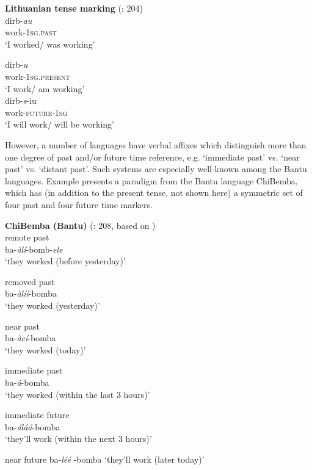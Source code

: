 \ea \label{ex:21.36}
\textbf{Lithuanian tense marking} (\citealt{ChungTimberlake1985}: 204)\\
\ea  
\gll dirb-\textit{au}\\
work-\textsc{1sg}\textsc{.past} \\
\glt ‘I worked/ was working’

\ex
\gll dirb-\textit{u}\\
work-\textsc{1sg}\textsc{.present} \\
\glt ‘I work/ am working’\\

\ex
\gll dirb-\textit{s}-iu\\
work-\textsc{future}-\textsc{1sg} \\
\glt ‘I will work/ will be working’
\z
\z

However, a number of languages have verbal affixes which distinguish more than one degree of past and/or future time reference, e.g. ‘immediate past’ vs. ‘near past’ vs. ‘distant past’. Such systems are especially well-known among the Bantu languages. Example  presents a paradigm from the Bantu language ChiBemba, which has (in addition to the present tense, not shown here) a symmetric set of four past and four future time markers.

\ea \label{ex:21.37}
\textbf{ChiBemba (Bantu)} (\citealt{ChungTimberlake1985}: 208, based on \citealt{Givón1972})\\
\ea  remote past\\
    ba-\textit{àlí}-bomb-\textit{ele}   \\
\glt‘they worked (before yesterday)’

\ex removed past\\
     ba-\textit{àlíí}-bomba   \\
\glt‘they worked (yesterday)’

\ex near past \\
    ba-\textit{àcí}-bomba   \\
\glt‘they worked (today)’

\ex immediate past \\
   ba-\textit{á}-bomba   \\
\glt‘they worked (within the last 3 hours)’

\ex immediate future   \\
 ba-\textit{áláá}-bomba \\  
\glt‘they’ll work (within the next 3 hours)’

\ex near future  
  ba-\textit{léé} -bomba   
\glt‘they’ll work (later today)’

